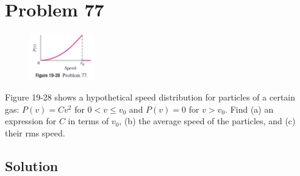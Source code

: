 \documentclass[12pt]{article}
\begin{document}
    \pagebreak
    \section{Problem 77}
        \begin{figure}
            \vspace{-30pt}
            \includegraphics[width=0.25\textwidth]{picture_19-28.png} 
        \end{figure}
        Figure 19-28 shows a hypothetical speed distribution for particles of a certain gas: $P(v) = Cv^2$ for $0 < v \leq v_0$ and $P(v) = 0$ for $v > v_0$.
        Find (a) an expression for $C$ in terms of $v_0$, (b) the average speed of the particles, and (c) their rms speed.

        \subsection{Solution}

    \pagebreak
    
    \tableofcontents
\end{document}
